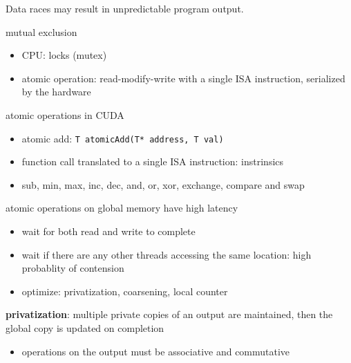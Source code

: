 \documentclass{article}
\begin{document}
Data races may result in unpredictable program output.


mutual exclusion

\begin{itemize}
\item CPU: locks (mutex)
\item atomic operation: read-modify-write with a single ISA instruction, serialized by the hardware

\end{itemize}
atomic operations in CUDA

\begin{itemize}
\item atomic add: \texttt{T atomicAdd(T* address, T val)}
\item function call translated to a single ISA instruction: instrinsics
\item sub, min, max, inc, dec, and, or, xor, exchange, compare and swap

\end{itemize}
atomic operations on global memory have high latency

\begin{itemize}
\item wait for both read and write to complete
\item wait if there are any other threads accessing the same location: high probablity of contension
\item optimize: privatization, coarsening, local counter

\end{itemize}
\textbf{privatization}: multiple private copies of an output are maintained, then the global copy is updated on completion

\begin{itemize}
\item operations on the output must be associative and commutative

\end{itemize}

\end{document}

